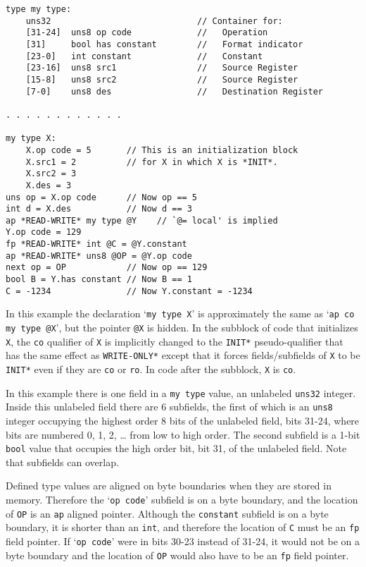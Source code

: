 \documentclass[12pt]{article}
\newenvironment{indpar}[1][0.3in]%
	{\begin{list}{}%
		     {\setlength{\itemsep}{0in}%
		      \setlength{\topsep}{0in}%
		      \setlength{\parsep}{1ex}%
		      \setlength{\labelwidth}{#1}%
		      \setlength{\leftmargin}{#1}%
		      \addtolength{\leftmargin}{\labelsep}}%
	 \item}%
	{\end{list}}
\begin{document}
\begin{indpar}\begin{verbatim}
type my type:
    uns32                             // Container for:
    [31-24]  uns8 op code             //   Operation
    [31]     bool has constant        //   Format indicator
    [23-0]   int constant             //   Constant
    [23-16]  uns8 src1                //   Source Register
    [15-8]   uns8 src2                //   Source Register
    [7-0]    uns8 des                 //   Destination Register

. . . . . . . . . . . .

my type X:
    X.op code = 5       // This is an initialization block
    X.src1 = 2          // for X in which X is *INIT*.
    X.src2 = 3
    X.des = 3
uns op = X.op code      // Now op == 5
int d = X.des           // Now d == 3
ap *READ-WRITE* my type @Y    // `@= local' is implied
Y.op code = 129
fp *READ-WRITE* int @C = @Y.constant
ap *READ-WRITE* uns8 @OP = @Y.op code
next op = OP            // Now op == 129
bool B = Y.has constant // Now B == 1
C = -1234               // Now Y.constant = -1234
\end{verbatim}\end{indpar}

In this example the declaration `{\tt my type X}' is approximately the same as
`{\tt ap co my type @X}', but the pointer {\tt @X} is hidden.
In the subblock of code that initializes {\tt X}, the {\tt co} qualifier
of {\tt X} is implicitly changed to the {\tt *INIT*} pseudo-qualifier that
has the same effect as {\tt *WRITE-ONLY*}
except that it forces fields/subfields of {\tt X} to be {\tt *INIT*}
even if they are {\tt co} or {\tt ro}.  In code after the subblock,
{\tt X} is {\tt co}.

In this example there is one field in a {\tt my type} value,
an unlabeled {\tt uns32} integer.
Inside this unlabeled field there are 6 subfields, the first of which is
an {\tt uns8} integer occupying the highest order 8
bits of the unlabeled field, bits 31-24,
where bits are numbered 0, 1, 2, \ldots{} from
low to high order.  The second subfield is a 1-bit {\tt bool}
value that occupies the high order bit, bit 31, of the unlabeled field.
Note that subfields can overlap.

Defined type values are aligned on byte boundaries when
they are stored in memory.  Therefore the `{\tt op code}' subfield
is on a byte boundary, and
the location of {\tt OP} is an {\tt ap} aligned pointer.  Although
the {\tt constant} subfield is on a byte boundary, it is
shorter than an {\tt int}, and therefore the
location of {\tt C} must be an {\tt fp} field pointer.
If `{\tt op code}' were in bits 30-23 instead of 31-24, it would
not be on a byte boundary and the location of {\tt OP} would
also have to be an {\tt fp} field pointer.
\end{document}

